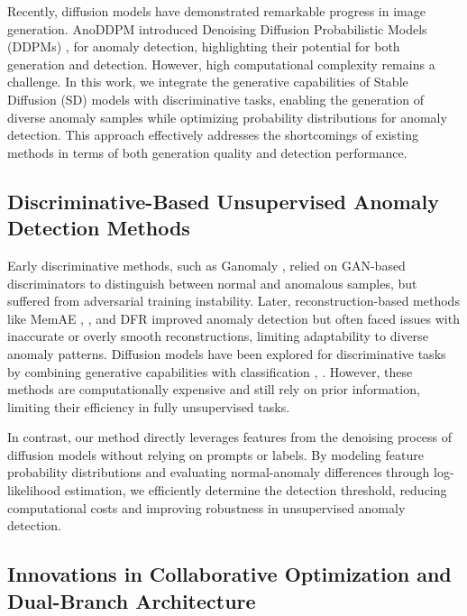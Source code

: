 Recently, diffusion models have demonstrated remarkable progress in image generation. AnoDDPM \cite{wyatt2022anoddpm} introduced Denoising Diffusion Probabilistic Models (DDPMs) \cite{ho2020denoising}, \cite{rombach2022high} for anomaly detection, highlighting their potential for both generation and detection. However, high computational complexity remains a challenge. In this work, we integrate the generative capabilities of Stable Diffusion (SD) \cite{rombach2022high} models with discriminative tasks, enabling the generation of diverse anomaly samples while optimizing probability distributions for anomaly detection. This approach effectively addresses the shortcomings of existing methods in terms of both generation quality and detection performance.

\subsection{Discriminative-Based Unsupervised Anomaly Detection Methods}

Early discriminative methods, such as Ganomaly \cite{akcay2019ganomaly}, relied on GAN-based discriminators to distinguish between normal and anomalous samples, but suffered from adversarial training instability. Later, reconstruction-based methods like MemAE \cite{gong2019memorizing}, \cite{kang2024anomaly}, and DFR \cite{yang2020dfr} improved anomaly detection but often faced issues with inaccurate or overly smooth reconstructions, limiting adaptability to diverse anomaly patterns.
Diffusion models have been explored for discriminative tasks by combining generative capabilities with classification \cite{li2023your}, \cite{mukhopadhyay2023diffusion}. However, these methods are computationally expensive and still rely on prior information, limiting their efficiency in fully unsupervised tasks.

In contrast, our method directly leverages features from the denoising process of diffusion models without relying on prompts or labels. By modeling feature probability distributions and evaluating normal-anomaly differences through log-likelihood estimation, we efficiently determine the detection threshold, reducing computational costs and improving robustness in unsupervised anomaly detection.


\subsection{Innovations in Collaborative Optimization and Dual-Branch Architecture}

